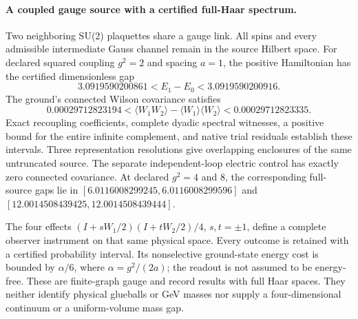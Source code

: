 \paragraph{A coupled gauge source with a certified full-Haar spectrum.}
Two neighboring SU(2) plaquettes share a gauge link.  All spins and every
admissible intermediate Gauss channel remain in the source Hilbert space.
For declared squared coupling $g^2=2$ and spacing $a=1$, the positive
Hamiltonian has the certified dimensionless gap
\[
  3.0919590200861 < E_1-E_0 < 3.0919590200916.
\]
The ground's connected Wilson covariance satisfies
\[
  0.00029712823194 <
  \langle W_1W_2\rangle-\langle W_1\rangle\langle W_2\rangle
  <0.00029712823335.
\]
Exact recoupling coefficients, complete dyadic spectral witnesses, a
positive bound for the entire infinite complement, and native trial
residuals establish these intervals.  Three representation resolutions
give overlapping enclosures of the same untruncated source.  The separate
independent-loop electric control has exactly zero connected covariance.
At declared $g^2=4$ and $8$, the corresponding full-source gaps lie in
$[6.0116008299245,6.0116008299596]$ and
$[12.0014508439425,12.0014508439444]$.

The four effects $(I+sW_1/2)(I+tW_2/2)/4$, $s,t=\pm1$, define a complete
observer instrument on that same physical space.  Every outcome is
retained with a certified probability interval.  Its nonselective
ground-state energy cost is bounded by $\alpha/6$, where
$\alpha=g^2/(2a)$; the readout is not assumed to be energy-free.
These are finite-graph gauge and record results with full Haar spaces.
They neither identify physical glueballs or GeV masses nor supply a
four-dimensional continuum or a uniform-volume mass gap.
